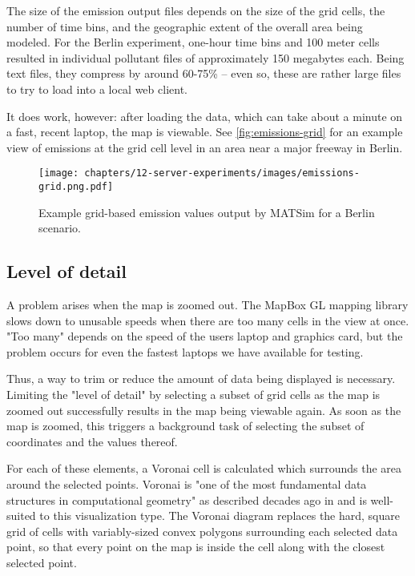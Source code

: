 The size of the emission output files depends on the size of the grid cells, the number of time bins, and the geographic extent of the overall area being modeled. For the Berlin experiment, one-hour time bins and 100 meter cells resulted in individual pollutant files of approximately 150 megabytes each. Being text files, they compress by around 60-75\% -- even so, these are rather large files to try to load into a local web client.

It does work, however: after loading the data, which can take about a minute on a fast, recent laptop, the map is viewable. See \autoref{fig:emissions-grid} for an example view of emissions at the grid cell level in an area near a major freeway in Berlin.

\begin{figure}[!ht]
  \texttt{[image: chapters/12-server-experiments/images/emissions-grid.png.pdf]}
  \caption{Example grid-based emission values output by MATSim for a Berlin scenario.}
  \label{fig:emissions-grid}
\end{figure}

\hypertarget{server-experiments-emissions-lod}{%
\subsection{Level of detail}
\label{server-experiments-emissions-lod}}

A problem arises when the map is zoomed out. The MapBox GL mapping library slows down to unusable speeds when there are too many cells in the view at once. "Too many" depends on the speed of the users laptop and graphics card, but the problem occurs for even the fastest laptops we have available for testing.

Thus, a way to trim or reduce the amount of data being displayed is necessary. Limiting the "level of detail" by selecting a subset of grid cells as the map is zoomed out successfully results in the map being viewable again. As soon as the map is zoomed, this triggers a background task of selecting the subset of coordinates and the values thereof.

For each of these elements, a Voronai cell is calculated which surrounds the area around the selected points. Voronai is "one of the most fundamental data structures in computational geometry" as described decades ago in \cite{aurenhammer1991voronoi} and is well-suited to this visualization type. The Voronai diagram replaces the hard, square grid of cells with variably-sized convex polygons surrounding each selected data point, so that every point on the map is inside the cell along with the closest selected point.

